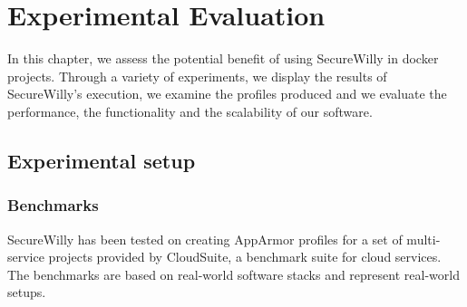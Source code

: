 \chapter{Experimental Evaluation}

In this chapter, we assess the potential benefit of using SecureWilly in docker projects. Through a variety of experiments, we display the results of SecureWilly's execution, we examine the profiles produced and we evaluate the performance, the functionality and the scalability of our software.

\section{Experimental setup}\label{expset}
\subsection{Benchmarks}
SecureWilly has been tested on creating AppArmor profiles for a set of multi-service projects provided by CloudSuite, a benchmark suite for cloud services. \cite{cloudsuite} The benchmarks are based on real-world software stacks and represent real-world setups. 

